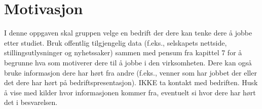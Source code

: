 \section{Motivasjon}
\label{sec:Motivasjon}
I denne oppgaven skal gruppen velge en bedrift der dere kan tenke dere å jobbe etter studiet. Bruk
offentlig tilgjengelig data (f.eks., selskapets nettside, stillingsutlysninger og nyhetssaker) sammen
med pensum fra kapittel 7 for å begrunne hva som motiverer dere til å jobbe i den virksomheten.
Dere kan også bruke informasjon dere har hørt fra andre (f.eks., venner som har jobbet der eller det
dere har hørt på bedriftspresentasjon). IKKE ta kontakt med bedriften. Husk å vise med kilder hvor
informasjonen kommer fra, eventuelt si hvor dere har hørt det i besvarelsen. 

